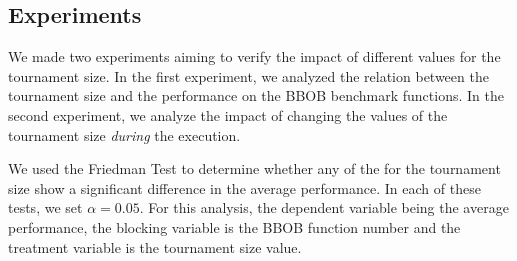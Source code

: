 %
%
%
%
%



\label{sec:experiment}

\subsection{Experiments}
We made two experiments aiming to verify the impact of different values for the tournament size. In the first experiment, we analyzed the relation between the tournament size and the performance on the BBOB benchmark functions. In the second experiment, we analyze the impact of changing the values of the tournament size \textit{during} the execution.

We used the Friedman Test to determine whether any of the for the tournament size show a significant difference in the average performance. In each of these tests, we set $\alpha = 0.05$. For this analysis, the dependent variable being the average performance, the blocking variable is the BBOB function number and the treatment variable is the tournament size value.

